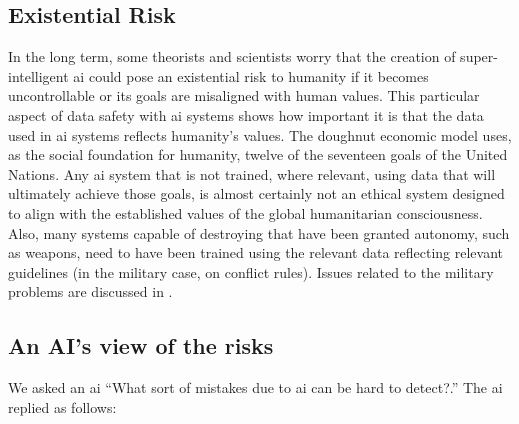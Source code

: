 \subsection{Existential Risk}
In the long term, some theorists and scientists worry that the creation of super-intelligent \gls{ai} could pose an existential risk to humanity if it becomes uncontrollable or its goals are misaligned with human values. This particular aspect of data safety with \gls{ai} systems shows how important it is that the data used in \gls{ai} systems reflects humanity's values. The doughnut economic model uses, as the social foundation for humanity, twelve of the seventeen goals of the United Nations. Any \gls{ai} system that is not trained, where relevant, using data that will ultimately achieve those goals, is almost certainly not an ethical system designed to align with the established values of the global humanitarian consciousness. Also, many systems capable of destroying that have been granted autonomy, such as  weapons, need to have been trained using the relevant data reflecting relevant guidelines (in the military case, on conflict rules). Issues related to the military problems are discussed in \cite{citation:SCSC152}.

\subsection{An AI's view of the risks}
We asked an \gls{ai} ``What sort of mistakes due to \gls{ai} can be hard to detect?.'' The \gls{ai} replied as follows:

